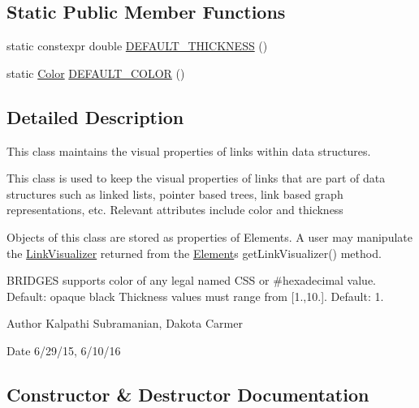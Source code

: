 \subsection*{Static Public Member Functions}
\begin{DoxyCompactItemize}
\item 
static constexpr double \mbox{\hyperlink{classbridges_1_1_link_visualizer_a6d05e052d64964d876f557901635079d}{D\+E\+F\+A\+U\+L\+T\+\_\+\+T\+H\+I\+C\+K\+N\+E\+SS}} ()
\item 
static \mbox{\hyperlink{classbridges_1_1_color}{Color}} \mbox{\hyperlink{classbridges_1_1_link_visualizer_a5e121c52fc270337c58413d0fd72cf58}{D\+E\+F\+A\+U\+L\+T\+\_\+\+C\+O\+L\+OR}} ()
\end{DoxyCompactItemize}


\subsection{Detailed Description}
This class maintains the visual properties of links within data structures. 

This class is used to keep the visual properties of links that are part of data structures such as linked lists, pointer based trees, link based graph representations, etc. Relevant attributes include color and thickness

Objects of this class are stored as properties of Elements. A user may manipulate the \mbox{\hyperlink{classbridges_1_1_link_visualizer}{Link\+Visualizer}} returned from the \mbox{\hyperlink{classbridges_1_1_element}{Element}}\textquotesingle{}s get\+Link\+Visualizer() method.

B\+R\+I\+D\+G\+ES supports color of any legal named C\+SS or \#hexadecimal value. Default\+: opaque black Thickness values must range from \mbox{[}1.,10.\mbox{]}. Default\+: 1.

\begin{DoxyAuthor}{Author}
Kalpathi Subramanian, Dakota Carmer 
\end{DoxyAuthor}
\begin{DoxyDate}{Date}
6/29/15, 6/10/16 
\end{DoxyDate}


\subsection{Constructor \& Destructor Documentation}
\mbox{\label{classbridges_1_1_link_visualizer_a69a84adf2b85773120d3f6afd938488e}} 
